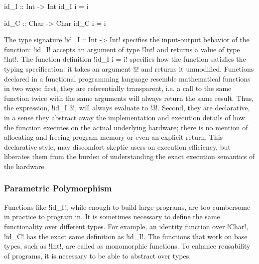 \documentclass[manuscript,screen,nonacm]{acmart}
\begin{document}
\begin{minipage}{0.5\linewidth}
\begin{code}
            id_I :: Int -> Int
            id_I i = i
\end{code}
\end{minipage}%
\begin{minipage}{0.5\linewidth}
\begin{code}
            id_C :: Char -> Char
            id_C i = i
\end{code}
\end{minipage}

The type signature !id_I :: Int -> Int! specifies the input-output behavior of the function: !id_I! accepts an argument of type !Int! and returns a value of type !Int!. The function definition !id_I i = i! specifies how the function satisfies the typing specification: it takes an argument !i! and returns it unmodified. Functions declared in a functional programming language resemble mathematical functions in two ways: first, they are referentially transparent, i.e.  a call to the same function twice with the same arguments will always return the same result. Thus, the expression, !id_I 3!, will always evaluate to !3!. Second, they are declarative, in a sense they abstract away the implementation and execution details of how the function executes on the actual underlying hardware; there is no mention of allocating and freeing program memory or even an explicit return. This declarative style, may discomfort skeptic users on execution efficiency, but liberates them from the burden of understanding the exact execution semantics of the hardware.

\subsubsection{Parametric Polymorphism}
Functions like !id_I!, while enough to build large programs, are too cumbersome in practice to program in. It is sometimes necessary to define the same functionality over different types. For example, an identity function over !Char!, !id_C! has the exact same definition as !id_I!. The functions that work on base types, such as !Int!, are called as monomorphic functions. To enhance reusability of programs, it is necessary to be able to abstract over types.
\end{document}
